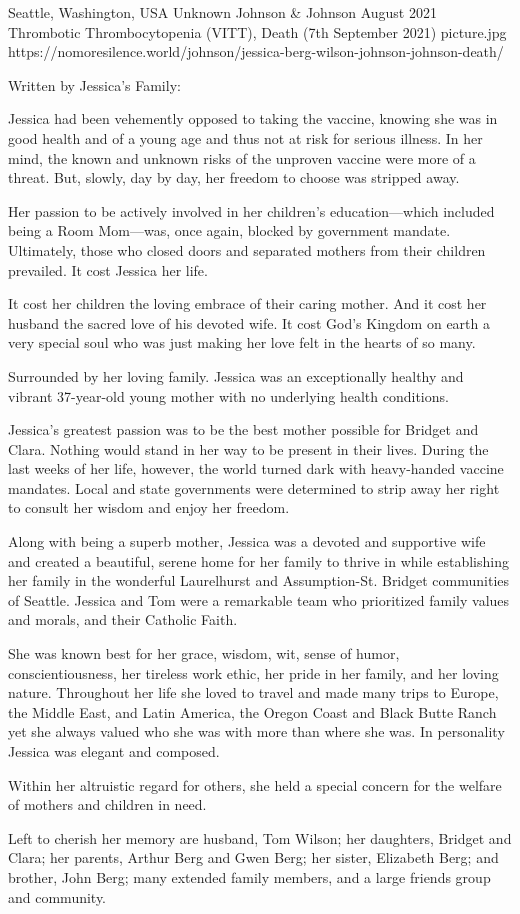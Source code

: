 {Seattle, Washington, USA}
{Unknown}
{Johnson \& Johnson }
{August 2021}
{Thrombotic Thrombocytopenia (VITT), Death (7th September 2021)}
{picture.jpg}
{https://nomoresilence.world/johnson/jessica-berg-wilson-johnson-johnson-death/}
{

Written by Jessica’s Family:

Jessica had been vehemently opposed to taking the vaccine, knowing she was in
good health and of a young age and thus not at risk for serious illness. In her
mind, the known and unknown risks of the unproven vaccine were more of a
threat. But, slowly, day by day, her freedom to choose was stripped away.

Her passion to be actively involved in her children’s education—which included
being a Room Mom—was, once again, blocked by government mandate. Ultimately,
those who closed doors and separated mothers from their children prevailed. It
cost Jessica her life.

It cost her children the loving embrace of their caring mother. And it cost her
husband the sacred love of his devoted wife. It cost God’s Kingdom on earth a
very special soul who was just making her love felt in the hearts of so many.

Surrounded by her loving family. Jessica was an exceptionally healthy and
vibrant 37-year-old young mother with no underlying health conditions.

Jessica’s greatest passion was to be the best mother possible for Bridget and
Clara. Nothing would stand in her way to be present in their lives. During the
last weeks of her life, however, the world turned dark with heavy-handed vaccine
mandates. Local and state governments were determined to strip away her right to
consult her wisdom and enjoy her freedom.

Along with being a superb mother, Jessica was a devoted and supportive wife and
created a beautiful, serene home for her family to thrive in while establishing
her family in the wonderful Laurelhurst and Assumption-St. Bridget communities
of Seattle. Jessica and Tom were a remarkable team who prioritized family values
and morals, and their Catholic Faith.

She was known best for her grace, wisdom, wit, sense of humor,
conscientiousness, her tireless work ethic, her pride in her family, and her
loving nature. Throughout her life she loved to travel and made many trips to
Europe, the Middle East, and Latin America, the Oregon Coast and Black Butte
Ranch yet she always valued who she was with more than where she was. In
personality Jessica was elegant and composed.

Within her altruistic regard for others, she held a special concern for the
welfare of mothers and children in need.

Left to cherish her memory are husband, Tom Wilson; her daughters, Bridget and
Clara; her parents, Arthur Berg and Gwen Berg; her sister, Elizabeth Berg; and
brother, John Berg; many extended family members, and a large friends group and
community.

}
